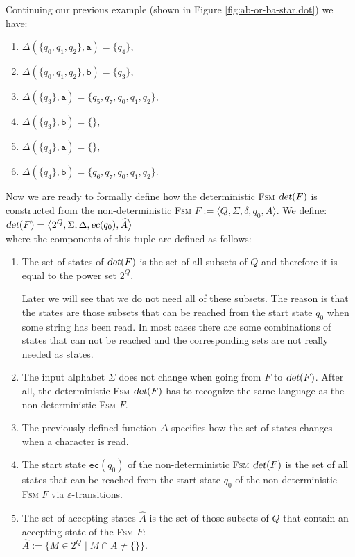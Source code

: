 \exampleEng
Continuing our previous example (shown in Figure \ref{fig:ab-or-ba-star.dot}) we have:
\begin{enumerate}
\item $\Delta(\{q_0, q_1, q_2\}, \texttt{a}) = \{ q_4 \}$,
\item $\Delta(\{q_0, q_1, q_2\}, \texttt{b}) = \{ q_3 \}$,
\item $\Delta(\{ q_3 \}, \texttt{a}) = \{ q_5, q_7, q_0, q_1, q_2 \}$,
\item $\Delta(\{ q_3 \}, \texttt{b}) = \{ \}$,
\item $\Delta(\{ q_4 \}, \texttt{a}) = \{ \}$,
\item $\Delta(\{ q_4 \}, \texttt{b}) = \{ q_6, q_7, q_0, q_1, q_2 \}$.
      \eox
\end{enumerate}
Now we are ready to formally define how the deterministic \textsc{Fsm} $\textsl{det}(F)$
is constructed from the non-deterministic \textsc{Fsm}
$F := \bigl\langle Q, \Sigma, \delta, q_0, A \bigr\rangle$.
We define: 
\\[0.2cm]
\hspace*{1.3cm}
$\textsl{det}(F) = \bigl\langle 2^Q, \Sigma, \Delta, \textsl{ec}(q_0), \widehat{A} \bigr\rangle$
\\[0.2cm]
where the components of this tuple are defined as follows:
\begin{enumerate}
\item The set of states of $\textsl{det}(F)$ is the set of all subsets of $Q$ and therefore it is equal to the power set
      $2^Q$.

      Later we will see that we do not need all of these subsets.
      The reason is that the states are those subsets that can be reached from the start state $q_0$ 
      when some string has been read.  In most cases there are some combinations of states that can not be reached
      and the corresponding sets are not really needed as states.
\item The input alphabet $\Sigma$ does not change when going from $F$ to $\textsl{det}(F)$.
      After all, the deterministic \textsc{Fsm}  $\textsl{det}(F)$ 
      has to recognize the same language as the non-deterministic \textsc{Fsm} $F$.
\item The previously defined function $\Delta$ specifies how the set of states changes when a
      character is read.
\item The start state $\texttt{ec}(q_0)$ of the non-deterministic \textsc{Fsm} $\textsl{det}(F)$ is the set of all states
      that can be reached from the start state $q_0$ of the non-deterministic \textsc{Fsm} $F$
      via $\varepsilon$-transitions.
\item The set of accepting states $\widehat{A}$ is the set of those subsets of $Q$ that contain an accepting
      state of the \textsc{Fsm} $F$:
      \\[0.2cm]
      \hspace*{1.3cm}
      $\widehat{A} := \bigl\{ M \in 2^Q \mid M \cap A \not= \{\} \bigl\}$.
\end{enumerate}

